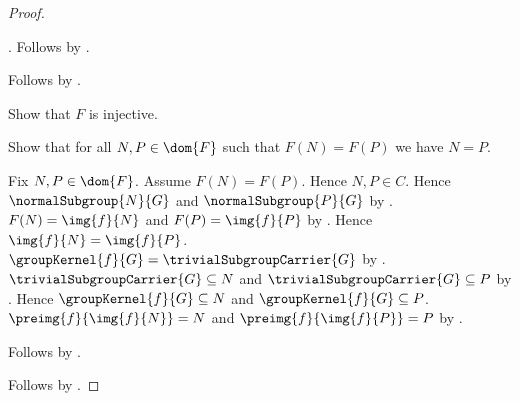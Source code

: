 \begin{proof}
\begin{subproof}
\begin{subproof}
                .
            Follows by \auto.
        \end{subproof}
        Follows by .
    \end{subproof}
    Show that $F$ is injective.
    \begin{subproof}
        Show that for all $N,P\in\dom{F}$ such that $F(N)=F(P)$
            we have $N=P$.
        \begin{subproof}
            Fix $N,P\in\dom{F}$.
            Assume $F(N)=F(P)$.
            Hence $N,P\in C$.
            Hence $\normalSubgroup{N}{G}$ and
                $\normalSubgroup{P}{G}$ by \auto.
            $F(N)=\img{f}{N}$ and $F(P)=\img{f}{P}$ by
                .
            Hence $\img{f}{N}=\img{f}{P}$.
            $\groupKernel{f}{G}=\trivialSubgroupCarrier{G}$ by
                .
            $\trivialSubgroupCarrier{G}\subseteq N$ and
                $\trivialSubgroupCarrier{G}\subseteq P$ by
                .
            Hence $\groupKernel{f}{G}\subseteq N$ and
                $\groupKernel{f}{G}\subseteq P$.
            $\preimg{f}{\img{f}{N}}=N$ and
                $\preimg{f}{\img{f}{P}}=P$ by
                .
        \end{subproof}
        Follows by .
    \end{subproof}
    Follows by .
\end{proof}

